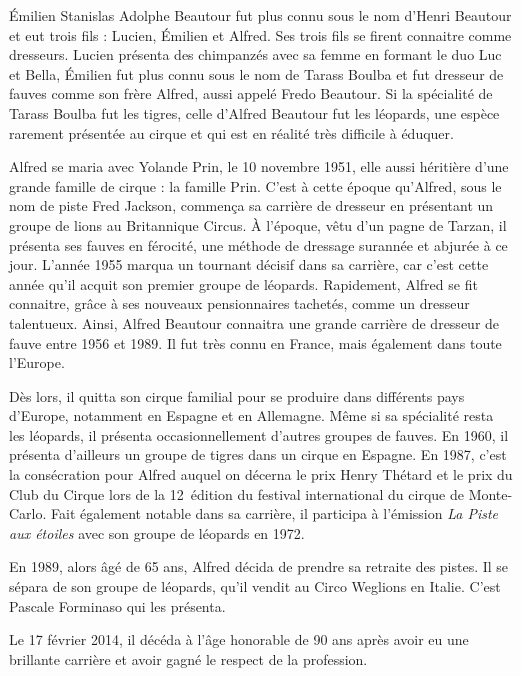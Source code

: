 Émilien Stanislas Adolphe Beautour fut plus connu sous le nom d’Henri Beautour et eut trois fils : Lucien, Émilien et Alfred. Ses trois fils se firent connaitre comme dresseurs. Lucien présenta des chimpanzés avec sa femme en formant le duo Luc et Bella, Émilien fut plus connu sous le nom de Tarass Boulba et fut dresseur de fauves comme son frère Alfred, aussi appelé Fredo Beautour.  Si la spécialité de Tarass Boulba fut les tigres, celle d’Alfred Beautour fut les léopards, une espèce rarement présentée au cirque et qui est en réalité très difficile à éduquer.

Alfred se maria avec Yolande Prin, le 10 novembre 1951, elle aussi héritière d’une grande famille de cirque : la famille Prin. C’est à cette époque qu’Alfred, sous le nom de piste Fred Jackson, commença sa carrière de dresseur en présentant un groupe de lions au Britannique Circus. À l’époque, vêtu d’un pagne de Tarzan, il présenta ses fauves en férocité, une méthode de dressage surannée et abjurée à ce jour. L'année 1955 marqua un tournant décisif dans sa carrière, car c’est cette année qu’il acquit son premier groupe de léopards. Rapidement, Alfred se fit connaitre, grâce à ses nouveaux pensionnaires tachetés, comme un dresseur talentueux. Ainsi, Alfred Beautour connaitra une grande carrière de dresseur de fauve entre 1956 et 1989. Il fut très connu en France, mais également dans toute l’Europe.

Dès lors, il quitta son cirque familial pour se produire dans différents pays d’Europe, notamment en Espagne et en Allemagne. Même si sa spécialité resta les léopards, il présenta occasionnellement d’autres groupes de fauves. En 1960, il présenta d’ailleurs un groupe de tigres dans un cirque en Espagne. En 1987, c’est la consécration pour Alfred auquel on décerna le prix Henry Thétard et le prix du Club du Cirque lors de la 12\ieme~édition du festival international du cirque de Monte-Carlo. Fait également notable dans sa carrière, il participa à l’émission \textit{La Piste aux étoiles} avec son groupe de léopards en 1972.

En 1989, alors âgé de 65 ans, Alfred décida de prendre sa retraite des pistes. Il se sépara de son groupe de léopards, qu'il vendit au Circo Weglions en Italie. C'est Pascale Forminaso qui les présenta.

Le 17 février 2014, il décéda à l’âge honorable de 90 ans après avoir eu une brillante carrière et avoir gagné le respect de la profession.

